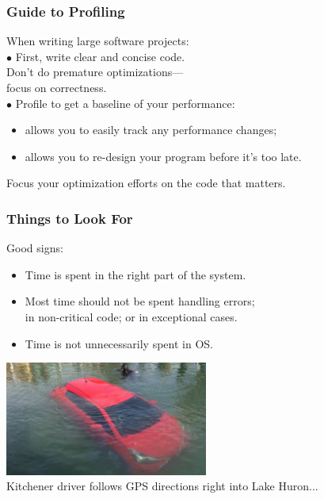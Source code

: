 \begin{frame}
  \frametitle{Guide to Profiling}

  

\begin{changemargin}{1cm}
  When writing large software projects:\\[1em]

     $\bullet$ First, write clear and concise code. \\
      \qquad Don't do premature optimizations---\\
      \qquad focus on correctness.\\
     $\bullet$ Profile to get a baseline of your performance:\\[0em]
      \begin{itemize}
        \item allows you to easily track any performance changes;
        \item allows you to re-design your program before it's too late.
      \end{itemize}
  Focus your optimization efforts on the code that matters.
  \end{changemargin}
\end{frame}

\begin{frame}
  \frametitle{Things to Look For}


\begin{changemargin}{1.5cm}
  
    Good signs:\\[0em]

    \begin{itemize}
      \item Time is spent in the right part of the system.
      \item Most time should not be spent handling errors;\\
 in non-critical code; or in exceptional cases.
      \item Time is not unnecessarily spent in OS.
    \end{itemize}
    \end{changemargin}
    
    \begin{center}
	\includegraphics[width=0.5\textwidth]{images/tobermory.jpg}\\
	\hfill Kitchener driver follows GPS directions right into Lake Huron...
 	\end{center}
    
\end{frame}



